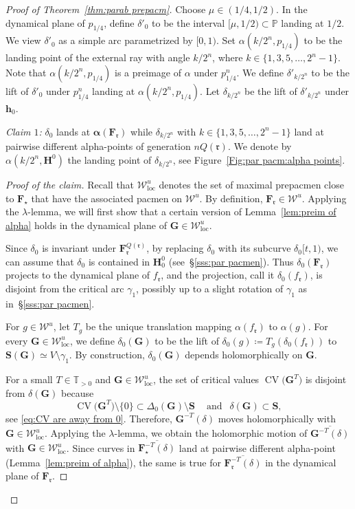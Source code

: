 \documentclass{amsart}
\renewcommand{\sp}{{\ \ }}
\newcommand{\1}{{\mathbb 1 }}
\newcommand\PT{\mathbb{ T}}
\newcommand{\bDelta}{{\mathbb{\Delta}}}
\newcommand{\bF}{{\mathbf F}}
\newcommand{\bS}{{\mathbf S}}
\newcommand{\bH}{{\mathbf H}}
\newcommand{\bG}{{\mathbf G}}
\newcommand{\bbh}{{\mathbf h}}
\newcommand{\str}{{\star}}
\newcommand{\rr}{\mathfrak{r}}
\def\loc{{\mathrm{loc}}}
\newcommand\WW{\mathcal{W}}
\newcommand\Unst{{\boldsymbol{\mathcal{W}}^u}}
\newcommand\UnstLoc{{\boldsymbol{\mathcal{W}}^u_\loc}}
\newcommand{\Parab}{\mathbb{P}}
\theoremstyle{remark}
\numberwithin{equation}{section}
\theoremstyle{definition}
\newcommand{\CV}{{\operatorname{CV}}}
\newcommand{\balpha}{{\boldsymbol \alpha}}
\theoremstyle{nonumberbreak}
\begin{document}
\begin{proof}[Proof of Theorem~\ref{thm:parab prepacm}]
Choose $\mu\in (1/4,1/2)$. In the dynamical plane of $p_{1/4}$, define $\delta'_0$ to be the interval $[\mu,1/2)\subset \Parab$ landing at $1/2$. We view $\delta'_0$ as a simple arc parametrized by $[0,1)$. Set $\alpha(k/2^n,p_{1/4})$ to be the landing point of the external ray with angle $k/2^n$, where $k\in \{1,3,5,\dots, 2^n-1\}$. Note that $\alpha(k/2^n,p_{1/4})$ is a preimage of $\alpha$ under $p_{1/4}^n$. We define $\delta'_{k/2^n}$ to be the lift of $\delta'_0$ under $p_{1/4}^n$ landing at $\alpha(k/2^n,p_{1/4})$. Let $\delta_{k/2^n}$  be the lift of $\delta'_{k/2^n}$ under $\bbh_0$.



\emph{Claim $1$:} $\delta_0$ lands at $\balpha(\bF_\rr)$ while $\delta_{k/2^n}$ with $k\in  \{1,3,5,\dots, 2^n-1\}$ land at pairwise different alpha-points of generation $nQ(\rr)$. We denote by $\alpha(k/2^n,\bH^0)$ the landing point of $\delta_{k/2^n}$, see Figure~\ref{Fig:par pacm:alpha points}.
\begin{proof}[Proof of the claim]
Recall that $\UnstLoc$ denotes the set of maximal prepacmen close to $\bF_\str$ that have  the associated pacmen on $\Unst$. By definition, $\bF_\rr\in \Unst$. Applying the $\lambda$-lemma, we will first show that a certain version of Lemma~\ref{lem:preim of alpha} holds in the dynamical plane of $\bG\in  \UnstLoc$.


Since $\delta_0$ is invariant under $\bF_\rr^{Q(\rr)}$, by replacing $\delta_0$ with its subcurve $\delta_0 [t,1)$, we can assume that $\delta_0$ is contained in $\bH^0_0$ (see~\S\ref{sss:par pacmen}). Thus $\delta_0(\bF_\rr)$ projects to the dynamical plane of $f_\rr$, and the projection, call it $\delta_0(f_\rr)$, is disjoint from the critical arc $\gamma_1$, possibly up to a slight rotation of $\gamma_1$ as in~\S\ref{sss:par pacmen}. 

For $g\in \WW^u$, let $T_g$ be the unique translation mapping $\alpha(f_\rr)$ to $\alpha(g)$. For every $\bG\in \UnstLoc$, we define $\delta_0(\bG)$ to be the lift of $\delta_0(g)\coloneqq T_g(\delta_0(f_\rr))$ to $\bS(\bG)\simeq V\setminus \gamma_1$. By construction, $\delta_0(\bG)$ depends holomorphically on $\bG$. 


For a small $T\in \PT_{>0}$ and $\bG\in \UnstLoc$, the set of critical values $\CV\big(\bG^T\big)$ is disjoint from $\delta(\bG)$ because  \[\CV\big(\bG^T\big)\setminus \{0\}\subset \bDelta_0(\bG)\setminus \bS\sp\sp \text{ and }\sp\delta(\bG)\subset \bS,\] see \eqref{eq:CV are away from 0}. Therefore,  $\bG^{-T}(\delta)$ moves holomorphically with $\bG\in \UnstLoc$. Applying the $\lambda$-lemma, we obtain the holomorphic motion of $\displaystyle{\overline {\bG^{-T}_{\ }(\delta)}}$ with $\bG\in \UnstLoc$. Since curves in  $\overline {\bF_\str^{-T}(\delta)}$ land at pairwise different alpha-point (Lemma~\ref{lem:preim of alpha}), the same is true for $\overline {\bF_\rr^{-T}(\delta)}$ in the dynamical plane of $\bF_\rr$.
 

\end{proof}
\end{proof}
\end{document}
